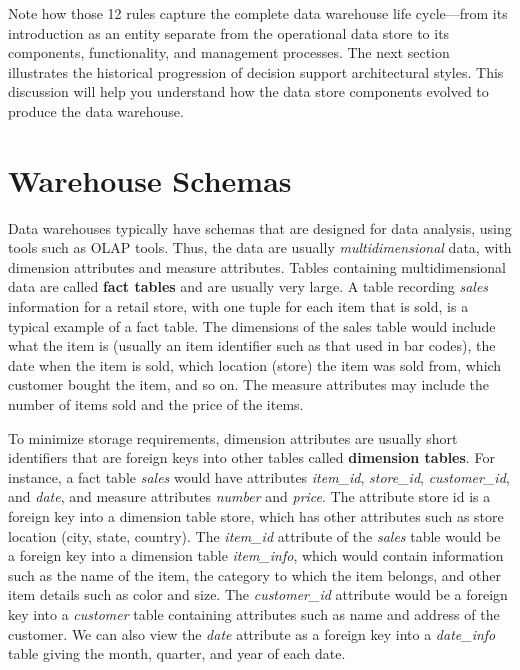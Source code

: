 \documentclass{vldb}
\begin{document}
Note how those 12 rules capture the complete data warehouse life cycle—from its introduction as an entity separate
from the operational data store to its components, functionality, and management processes. The next section
illustrates the historical progression of decision support architectural styles. This discussion will help you understand
how the data store components evolved to produce the data warehouse.

\section{Warehouse Schemas}
Data warehouses typically have schemas that are designed for data analysis, using
tools such as OLAP tools. Thus, the data are usually \textit{multidimensional} data, with
dimension attributes and measure attributes. Tables containing multidimensional
data are called \textbf{fact tables} and are usually very large. A table recording \textit{sales}
information for a retail store, with one tuple for each item that is sold, is a typical
example of a fact table. The dimensions of the sales table would include what the
item is (usually an item identifier such as that used in bar codes), the date when
the item is sold, which location (store) the item was sold from, which customer
bought the item, and so on. The measure attributes may include the number of
items sold and the price of the items.

To minimize storage requirements, dimension attributes are usually short
identifiers that are foreign keys into other tables called \textbf{dimension tables}. For
instance, a fact table \textit{sales} would have attributes \textit{item\_id}, \textit{store\_id}, \textit{customer\_id}, and
\textit{date}, and measure attributes \textit{number} and \textit{price}. The attribute store id is a foreign
key into a dimension table store, which has other attributes such as store location
(city, state, country). The \textit{item\_id} attribute of the \textit{sales} table would be a foreign key
into a dimension table \textit{item\_info}, which would contain information such as the
name of the item, the category to which the item belongs, and other item details
such as color and size. The \textit{customer\_id} attribute would be a foreign key into a
\textit{customer} table containing attributes such as name and address of the customer.
We can also view the \textit{date} attribute as a foreign key into a \textit{date\_info} table giving the
month, quarter, and year of each date.
\end{document}
